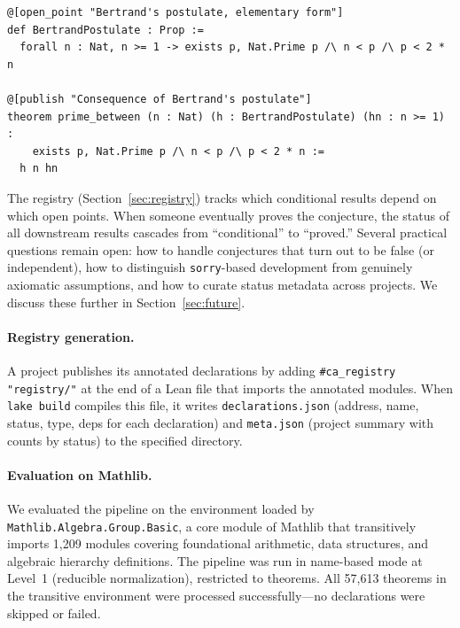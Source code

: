\begin{lstlisting}[caption={An open conjecture and a conditional result}]
@[open_point "Bertrand's postulate, elementary form"]
def BertrandPostulate : Prop :=
  forall n : Nat, n >= 1 -> exists p, Nat.Prime p /\ n < p /\ p < 2 * n

@[publish "Consequence of Bertrand's postulate"]
theorem prime_between (n : Nat) (h : BertrandPostulate) (hn : n >= 1) :
    exists p, Nat.Prime p /\ n < p /\ p < 2 * n :=
  h n hn
\end{lstlisting}

The registry (Section~\ref{sec:registry}) tracks which conditional
results depend on which open points.  When someone eventually proves the
conjecture, the status of all downstream results cascades from
``conditional'' to ``proved.''  Several practical questions remain open:
how to handle conjectures that turn out to be false (or independent),
how to distinguish \texttt{sorry}-based development from genuinely
axiomatic assumptions, and how to curate status metadata across
projects.  We discuss these further in Section~\ref{sec:future}.

\paragraph{Registry generation.}
A project publishes its annotated declarations by adding
\texttt{\#ca\_registry "registry/"} at the end of a Lean file that
imports the annotated modules.  When \texttt{lake build} compiles this
file, it writes \texttt{declarations.json} (address, name, status,
type, deps for each declaration) and \texttt{meta.json} (project
summary with counts by status) to the specified directory.

\paragraph{Evaluation on Mathlib.}
We evaluated the pipeline on the environment loaded by
\texttt{Mathlib.\allowbreak Algebra.\allowbreak Group.\allowbreak Basic}, a core module of Mathlib that
transitively imports 1{,}209 modules covering foundational arithmetic,
data structures, and algebraic hierarchy definitions.  The pipeline was
run in name-based mode at Level~1 (reducible normalization), restricted
to theorems.  All 57{,}613 theorems in the transitive environment were
processed successfully---no declarations were skipped or failed.

